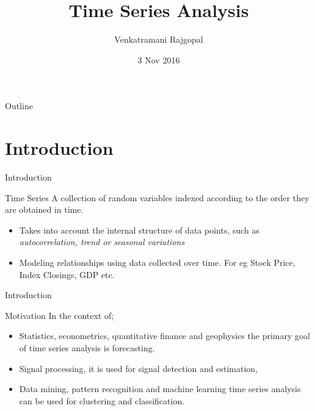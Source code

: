\documentclass{beamer}
\title{Time Series Analysis}
\author{Venkatramani Rajgopal}
\institute[] 
{\	Department of Mathematics\\
		University of Applied Sciences, Mittweida}
\date{3 Nov 2016}
\begin{document}
\begin{frame}
\titlepage
\end{frame}

\begin{frame}{Outline}
\tableofcontents
\end{frame}		


\section{Introduction}
\begin{frame}{Introduction}
\begin{block}{Time Series}
A collection of random variables indexed according to the order they are obtained in time. 
\end{block}

\pause
\begin{itemize}
\item Takes into account the internal structure of data points, such as \textit{autocorrelation, trend or seasonal variations}
\item Modeling relationships using data collected over time. For eg Stock Price, Index Closings, GDP etc.  
\end{itemize}

\end{frame}
\begin{frame}{Introduction}
	\begin{block}{Motivation}
		In the context of; 
		\begin{itemize}
			\item Statistics, econometrics, quantitative finance and geophysics the primary goal of time series analysis is forecasting.
			\item Signal processing, it is used for signal detection and estimation, 
			\item Data mining, pattern recognition and machine learning time series analysis can be used for clustering and classification. 
		\end{itemize}
		
		
	\end{block}
	
\end{frame}
\end{document}
